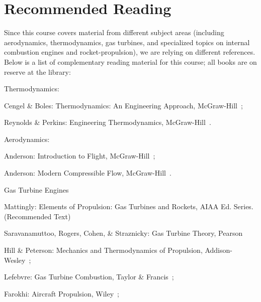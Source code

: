\section*{\label{SEC_REFERENCES}Recommended Reading}

Since this course covers material from different subject areas (including aerodynamics, thermodynamics, gas turbines, and specialized topics on internal combustion engines and rocket-propulsion), we are relying on different references. Below is a list of complementary reading material for this course; all books are on reserve at the library:
\begin{itemizePacked}
 \item Thermodynamics:
  \begin{itemizePacked}
   \item Cengel \& Boles: Thermodynamics: An Engineering Approach, McGraw-Hill~\cite{CENGEL_BOLES_BOOK2010};
   \item Reynolds \& Perkins: Engineering Thermodynamics, McGraw-Hill~\cite{REYNOLDS_PERKINS_BOOK1977}.
  \end{itemizePacked}
 \item Aerodynamics:
  \begin{itemizePacked}
   \item Anderson: Introduction to Flight, McGraw-Hill~\cite{ANDERSON_INTRO_TO_FLIGHT_BOOK2012};
   \item	Anderson: Modern Compressible Flow, McGraw-Hill~\cite{ANDERSON_MODERN_COMPRESS_FLOWS_BOOK2004}.
  \end{itemizePacked}
 \item	Gas Turbine Engines
  \begin{itemizePacked}
   \item    Mattingly: Elements of Propulsion: Gas Turbines and Rockets, AIAA Ed. Series.~\cite{MATTINGLY_BOOK2006} (Recommended Text)
   \item    Saravanamuttoo, Rogers, Cohen, \& Straznicky: Gas Turbine Theory, Pearson~\cite{SARAVANAMUTTOO_ROGERS_COHEN_STRAZNICKY_BOOK2008}
   \item	Hill \& Peterson: Mechanics and Thermodynamics of Propulsion, Addison-Wesley~\cite{HILL_PETERSON_BOOK1992};
   \item	Lefebvre: Gas Turbine Combustion, Taylor \& Francis~\cite{LEFEBVRE_BOOK1999};
   \item	Farokhi: Aircraft Propulsion, Wiley~\cite{FAROKHI_BOOK2009};

\end{itemizePacked}
\end{itemizePacked}
